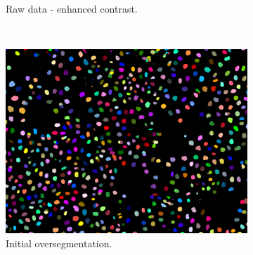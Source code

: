 \begin{figure}
\begin{subfigure}[t]{0.48\textwidth}
        \caption{Raw data - enhanced contrast.}
    \end{subfigure}
    \\
    \begin{subfigure}[t]{0.48\textwidth}
        \includegraphics[width=\textwidth]{images/joint/overseg/75/colored.png}
        \caption{Initial oversegmentation.}
    \end{subfigure}
    \hfill
    \begin{subfigure}[t]{0.48\textwidth}
\end{subfigure}
\end{figure}
